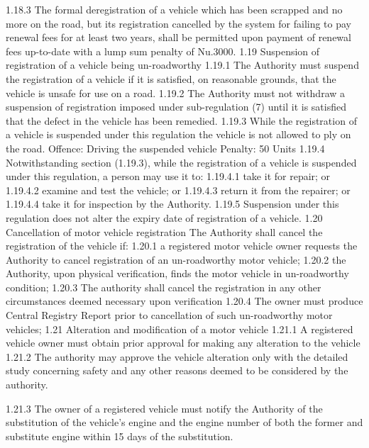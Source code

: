 \documentclass[
]{book}
\begin{document}
\begin{enumerate}
  1.18.3 The formal deregistration of a vehicle which has been scrapped and no more on the road, but its registration cancelled by the system for failing to pay renewal fees for at least two years, shall be permitted upon payment of renewal fees up-to-date with a lump sum penalty of Nu.3000.
  1.19 Suspension of registration of a vehicle being un-roadworthy
  1.19.1 The Authority must suspend the registration of a vehicle if it is satisfied, on reasonable grounds, that the vehicle is unsafe for use on a road.
  1.19.2 The Authority must not withdraw a suspension of registration imposed under sub-regulation (7) until it is satisfied that the defect in the vehicle has been remedied.
  1.19.3 While the registration of a vehicle is suspended under this regulation the vehicle is not allowed to ply on the road.
  Offence: Driving the suspended vehicle
  Penalty: 50 Units
  1.19.4 Notwithstanding section (1.19.3), while the registration of a vehicle is suspended under this regulation, a person may use it to:
  1.19.4.1 take it for repair; or
  1.19.4.2 examine and test the vehicle; or
  1.19.4.3 return it from the repairer; or
  1.19.4.4 take it for inspection by the Authority.
  1.19.5 Suspension under this regulation does not alter the expiry date of registration of a vehicle.
  1.20 Cancellation of motor vehicle registration
  The Authority shall cancel the registration of the vehicle if:
  1.20.1 a registered motor vehicle owner requests the Authority to cancel registration of an un-roadworthy motor vehicle;
  1.20.2 the Authority, upon physical verification, finds the motor vehicle in un-roadworthy condition;
  1.20.3 The authority shall cancel the registration in any other circumstances deemed necessary upon verification
  1.20.4 The owner must produce Central Registry Report prior to cancellation of such un-roadworthy motor vehicles;
  1.21 Alteration and modification of a motor vehicle
  1.21.1 A registered vehicle owner must obtain prior approval for making any alteration to the vehicle
  1.21.2 The authority may approve the vehicle alteration only with the detailed study concerning safety and any other reasons deemed to be considered by the authority.
\end{enumerate}

1.21.3 The owner of a registered vehicle must notify the Authority of the substitution of the vehicle's engine and the engine number of both the former and substitute engine within 15 days of the substitution.
\end{document}
